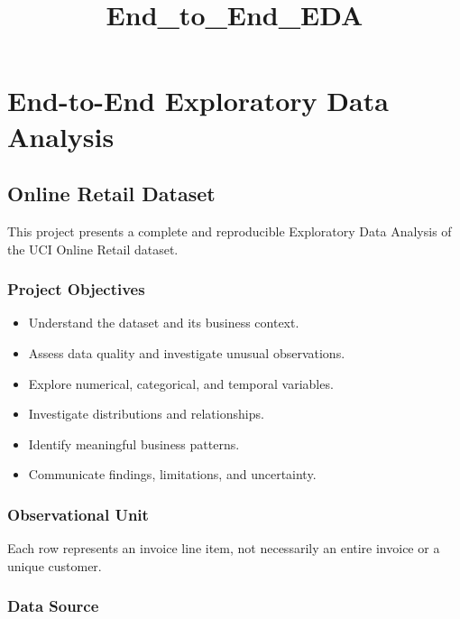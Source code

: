 \documentclass[11pt]{article}
\title{End\_to\_End\_EDA}
\providecommand{\tightlist}{%
      \setlength{\itemsep}{0pt}\setlength{\parskip}{0pt}}
\begin{document}
    
    \maketitle
    
    

    
    \section{End-to-End Exploratory Data
Analysis}\label{end-to-end-exploratory-data-analysis}

\subsection{Online Retail Dataset}\label{online-retail-dataset}

This project presents a complete and reproducible Exploratory Data
Analysis of the UCI Online Retail dataset.

\subsubsection{Project Objectives}\label{project-objectives}

\begin{itemize}
\tightlist
\item
  Understand the dataset and its business context.
\item
  Assess data quality and investigate unusual observations.
\item
  Explore numerical, categorical, and temporal variables.
\item
  Investigate distributions and relationships.
\item
  Identify meaningful business patterns.
\item
  Communicate findings, limitations, and uncertainty.
\end{itemize}

\subsubsection{Observational Unit}\label{observational-unit}

Each row represents an invoice line item, not necessarily an entire
invoice or a unique customer.

\subsubsection{Data Source}\label{data-source}
\end{document}
